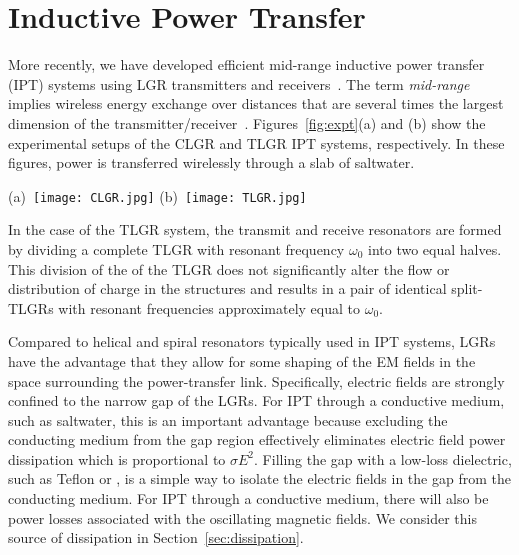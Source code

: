 \documentclass[conference]{IEEEtran}
\begin{document}
\section{Inductive Power Transfer}
More recently, we have developed efficient mid-range inductive power transfer (IPT) systems using LGR transmitters and receivers~\cite{Roberts:2020}.  The term {\it mid-range} implies wireless energy exchange over distances that are several times the largest dimension of the transmitter/receiver~\cite{Soljacic:2007, Karalis:2008}.  Figures~\ref{fig:expt}(a) and (b) show the experimental setups of the CLGR and TLGR IPT systems, respectively.  In these figures, power is transferred wirelessly through a slab of saltwater.  
\begin{figure*}[t]
\centerline{(a)~\texttt{[image: CLGR.jpg]} \quad (b)~\texttt{[image: TLGR.jpg]}}
\caption{Photographs of IPT through a \SI[number-unit-product={\text{-}}]{3.7}{\centi\meter} thick slab of saltwater for both the (a) CLGR and (b) split-TLGR systems. The coarse and fine dividers used with the split-TLGR system are also shown in (b).  The \SI{102}{\micro\meter} gaps in the CLGRs are so narrow that they are not clearly visibile in the photograph.}
\label{fig:expt}
\end{figure*}
In the case of the TLGR system, the transmit and receive resonators are formed by dividing a complete TLGR with resonant frequency $\omega_0$ into two equal halves.  This division of the of the TLGR does not significantly alter the flow or distribution of charge in the structures and results in a pair of identical split-TLGRs with resonant frequencies approximately equal to $\omega_0$.  

Compared to helical and spiral resonators typically used in IPT systems, LGRs have the advantage that they allow for some shaping of the EM fields in the space surrounding the power-transfer link.  Specifically, electric fields are strongly confined to the narrow gap of the LGRs.  For IPT through a conductive medium, such as saltwater, this is an important advantage because excluding the conducting medium from the gap region effectively eliminates electric field power dissipation which is proportional to $\sigma E^2$.  Filling the gap with a low-loss dielectric, such as Teflon or , is a simple way to isolate the electric fields in the gap from the conducting medium.  For IPT through a conductive medium, there will also be power losses associated with the oscillating magnetic fields.  We consider this source of dissipation in Section~\ref{sec:dissipation}. 
\end{document}
